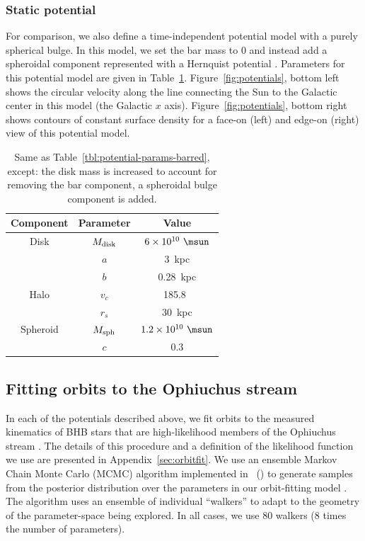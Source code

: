 \documentclass[numberedappendix]{emulateapj}
\begin{document}
\subsubsection{Static potential}

For comparison, we also define a time-independent potential model with a purely spherical bulge. In this model, we set the bar mass to 0 and instead add a spheroidal component represented with a Hernquist potential \citep{hernquist90}. Parameters for this potential model are given in Table~\ref{tbl:potential-params-static}. Figure~\ref{fig:potentials}, bottom left shows the circular velocity along the line connecting the Sun to the Galactic center in this model (the Galactic $x$ axis). Figure~\ref{fig:potentials}, bottom right shows contours of constant surface density for a face-on (left) and edge-on (right) view of this potential model.

\begin{table}[ht]
\begin{center}
	\begin{tabular}{ c | c | c }
	         \toprule
	         Component & Parameter & Value \\\toprule
		Disk & $M_{\rm disk}$ & $6 \times 10^{10}~\msun$ \\
		& $a$ & 3~{\rm kpc}\\
		& $b$ & 0.28~{\rm kpc} \\\midrule
	         Halo & $v_c$ & 185.8~\kms\\
		& $r_s$ & 30~kpc \\\midrule
		Spheroid & $M_{\rm sph}$ & $1.2 \times 10^{10}~\msun$ \\
		& $c$ & 0.3 \\
		\bottomrule
		\end{tabular}
	\caption{Same as Table~\ref{tbl:potential-params-barred}, except: the disk mass is increased to account for removing the bar component, a spheroidal bulge component is added. \label{tbl:potential-params-static}}
\end{center}
\end{table}

\subsection{Fitting orbits to the Ophiuchus stream}\label{sec:orbitfit-nonapdx}

In each of the potentials described above, we fit orbits to the measured kinematics of BHB stars that are high-likelihood members of the Ophiuchus stream \citep{sesar15a, sesar16}. The details of this procedure and a definition of the likelihood function we use are presented in Appendix~\ref{sec:orbitfit}. We use an ensemble Markov Chain Monte Carlo (MCMC) algorithm \citep{goodman10} implemented in \python\ () to generate samples from the posterior distribution over the parameters in our orbit-fitting model \citep{foremanmackey13}. The algorithm uses an ensemble of individual ``walkers'' to adapt to the geometry of the parameter-space being explored. In all cases, we use 80 walkers (8 times the number of parameters).
\end{document}
